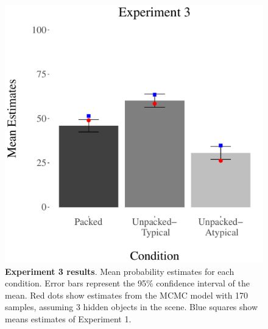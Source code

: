 \begin{figure}[ht!]
\centering
\includegraphics[scale=0.5]{figures/estimates3.pdf}
\caption{\textbf{Experiment 3 results}. Mean probability estimates for each condition. Error bars represent the 95\% confidence interval of the mean. Red dots show estimates from the MCMC model with 170 samples, assuming 3 hidden objects in the scene. Blue squares show means estimates of Experiment 1.}
\label{fig:resultstime}
\end{figure}

